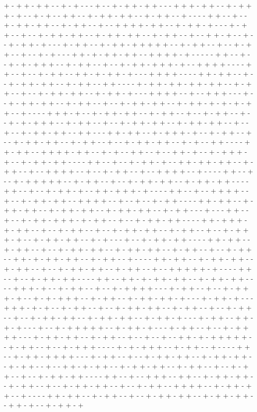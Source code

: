 + - + + - + + - - + - + - - - + - - + - + + - + + - - - + + + - + + - - + - + + + - + - - + - + - - + + - - + - + + - + + - - + - + + - - + - - - - + + - - + - - + - + + - + + - - + - + + - - + - - + + + + - + + - - + - + + - + - - - + - + + - - + - - + - + + - + + - - + - + + - + + - - + - + + - - + - - + + - + - - + - - + - + + - + - - - + - + + - - + - + + - + + + + + - - + - + + - - + - - + - + + - - + - - + - + - - - + + - + - + + - + + - - + + + + - + - - - - - + + - - + - - + - + - + + + - - + - + + - - + - - + - + + - + + + - + - - + + + + - - - - + + - - + - - + - + + - - + + - + - + + - + - - - + + + + - - - - + + - + + - - + - - + - + + - + + - - + - + + - - + + - - - - + - + + - + + - + + - + + - - + - + + - - + - - + - + + - + + - - + - + + - + - - - + + + + - - + - - + + + - - - + - - + - + + - + + - - + - + + - - + - - + - + + - + + - - + - + + - + - + - + - + + - - + - - - - + + + - + - - + - + + - + + - - + - + + - - + - - + - + + - - + - - + - + - + + + - - + - + + - - + - - + - + + - + + - - + - + + - + + - - + - - + - - + - + + - + + - - + + - - - + + - + + - - + - + + + - + - - + - + + - - + - - + - + + - + + - - + - + + - - + - - + - + + - + + - - + - + - - + + - - - - + + - + + - - + + + + - + + - - + - + - - + + - - + - - + + - + - - + - + + + - + - - + - + + - + + - - - - + + - - + - - + - + + - + - - + + - + + - + + - - + - + + - - + - - + + + + - - + - - + - + + - - + - - + + + + - - + - - - - + + - - + - - + - + + + + + - - + - + + - - + - - + - + + - + + - - + - + + - + + - - - - + + - - + - - + - + + - + - - + + - + + + - + - - - - + + - - + - - + + + + - - + - - + - + + - + + - - + + + + - - + - - + - - + - + + - - - - + + - + + - - + - + + - + + - - + - + + - + + - - + - + + - + + - - + - + + - - - + - - - + + - - + - - + - + + - + + + - + - + + - - + - - + - + + - + + - - - - + + - + + + - + - + + - - + - - + - + + - - + - - + - + + - + + - - + - + + - - + - - + - + + + - + - - + - + + - + + - - + - + - - - + - - + - + + - + + - - - - + + - + + - - + - + + - - + - - + - + + - + + - - + - + + - + + - - + - + + - - + - - + - + + - - + + - + - + + - + + - - + - + + - - + - - - - + + - + + - - + - + + - + + - - + - + + - - + - - + - + + - + + - - + - + + - - + - - + + + + + - + - - - - + + - - + - - + - + + - + + - - - - + + - - + + - + - + + - + + - - + - + + - + + - - - - + + + - + - - + - + + - - + - - + - + + + + - - - + - + + - - + - - + - + + + - + - - + - + - + + + - - + - + + - - + - + + - + + - + - - - + - + + - + - - - + + + - + - + - - + - + + - - + - - + - + + - + + - - + - + + - - + - - + - + + - - + - - + - + + - + + - - + - + + - + + - - + - + + - + - - - + - + + - - + + - + - + - - - + - - + - + + + + + - - + - + + - + - - - + - + + - - + - - + - + + + + - - - + - + + - + + - - + - + + - - + - - + - - + - - + + - + - + + + + + - - + - + + - - + - - + - + + + - - - - + - + - + + + - - + - + + - - + - - - - + + - - + - + + - + + + + - - - + - + + - - + - - + - + + - + + - - + - + + - + + - - + - + + - - + - - + + - + - + + - - + - + + - + + - - + - + + - - + - - + - + + - - + - - + - + + - + + - - - - + + - - + - - + + + - - + + - - + - + + - + + - - + - + + - - + - - + - + + - + + - - + - - + - + + - - + + + + - - + - + + - + + - - + - - - - + + - + + - - + - + + - - + - - + - + + - + + - - + - + + - + + - - + + - + - - + - + + - + 
